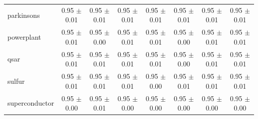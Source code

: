 \begin{table}[!htbp]
{\begin{tabular}{lccccccc}
parkinsons & 0.95 $\pm$ 0.01 & 0.95 $\pm$ 0.01 & 0.95 $\pm$ 0.01 & 0.95 $\pm$ 0.01 & 0.95 $\pm$ 0.01 & 0.95 $\pm$ 0.01 & 0.95 $\pm$ 0.01 \\
powerplant & 0.95 $\pm$ 0.01 & 0.95 $\pm$ 0.00 & 0.95 $\pm$ 0.01 & 0.95 $\pm$ 0.01 & 0.95 $\pm$ 0.00 & 0.95 $\pm$ 0.01 & 0.95 $\pm$ 0.01 \\
qsar & 0.95 $\pm$ 0.01 & 0.95 $\pm$ 0.01 & 0.95 $\pm$ 0.01 & 0.95 $\pm$ 0.01 & 0.95 $\pm$ 0.00 & 0.95 $\pm$ 0.01 & 0.95 $\pm$ 0.01 \\
sulfur & 0.95 $\pm$ 0.01 & 0.95 $\pm$ 0.01 & 0.95 $\pm$ 0.01 & 0.95 $\pm$ 0.00 & 0.95 $\pm$ 0.01 & 0.95 $\pm$ 0.01 & 0.95 $\pm$ 0.01 \\
superconductor & 0.95 $\pm$ 0.00 & 0.95 $\pm$ 0.01 & 0.95 $\pm$ 0.00 & 0.95 $\pm$ 0.00 & 0.95 $\pm$ 0.00 & 0.95 $\pm$ 0.00 & 0.95 $\pm$ 0.00 \\
\bottomrule
\end{tabular}
}
\end{table}